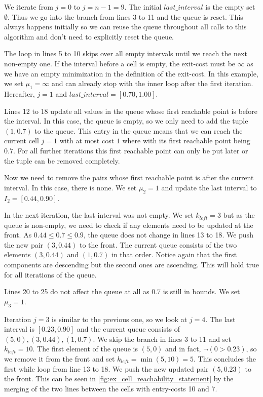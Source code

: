 We iterate from \(j = 0\) to \(j = n - 1 = 9\). The initial \(last\_interval\) is the empty set \(\emptyset\). Thus we go into the branch from lines 3 to 11 and the queue is reset. This always happens initially so we can reuse the queue throughout all calls to this algorithm and don't need to explicitly reset the queue. 

The loop in lines 5 to 10 skips over all empty intervals until we reach the next non-empty one. If the interval before a cell is empty, the exit-cost must be \(\infty\) as we have an empty minimization in the definition of the exit-cost. In this example, we set \(\mu_1 = \infty\) and can already stop with the inner loop after the first iteration. Hereafter, \(j = 1\) and \(last\_interval = [0.70, 1.00]\). 

Lines 12 to 18 update all values in the queue whose first reachable point is before the interval. In this case, the queue is empty, so we only need to add the tuple \((1, 0.7)\) to the queue. This entry in the queue means that we can reach the current cell \(j = 1\) with at most cost \(1\) where with its first reachable point being \(0.7\). For all further iterations this first reachable point can only be put later or the tuple can be removed completely. 

Now we need to remove the pairs whose first reachable point is after the current interval. In this case, there is none. We set \(\mu_2 = 1\) and update the last interval to \(I_2 = [0.44, 0.90]\).

In the next iteration, the last interval was not empty. We set \(k_{left} = 3\) but as the queue is non-empty, we need to check if any elements need to be updated at the front. As \(0.44 \leq 0.7 \leq 0.9\), the queue does not change in lines 13 to 18. We push the new pair \((3, 0.44)\) to the front. The current queue consists of the two elements \((3, 0.44)\) and \((1, 0.7)\) in that order. Notice again that the first components are descending but the second ones are ascending. This will hold true for all iterations of the queue. 

Lines 20 to 25 do not affect the queue at all as \(0.7\) is still in bounds. We set \(\mu_3 = 1\). 

Iteration \(j = 3\) is similar to the previous one, so we look at \(j = 4\). The last interval is \([0.23, 0.90]\) and the current queue consists of \((5, 0), (3, 0.44), (1, 0.7)\). We skip the branch in lines 3 to 11 and set \(k_{left} = 10\). The first element of the queue is \((5, 0)\) and in fact, \(\lnot(0 > 0.23)\), so we remove it from the front and set \(k_{left} = \min(5, 10) = 5\). This concludes the first while loop from line 13 to 18. We push the new updated pair \((5, 0.23)\) to the front. This can be seen in \cref{fig:ex_cell_reachability_statement} by the merging of the two lines between the cells with entry-costs 10 and 7. 

